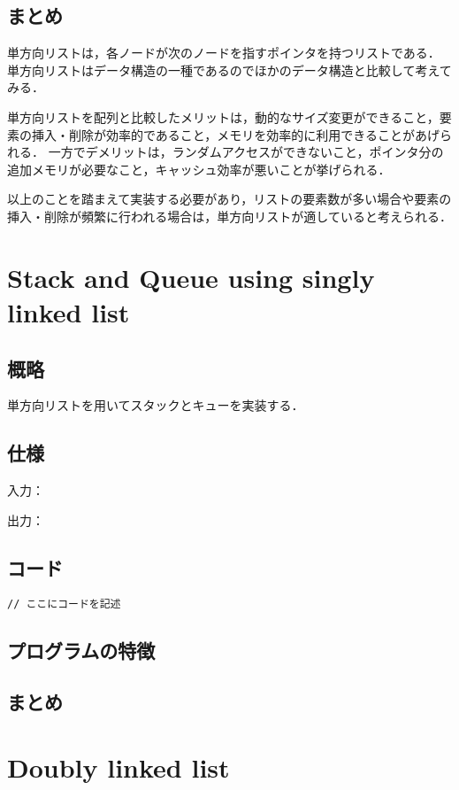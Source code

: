 \documentclass{ltjsarticle}
\begin{document}
\subsection{まとめ}
単方向リストは，各ノードが次のノードを指すポインタを持つリストである．
単方向リストはデータ構造の一種であるのでほかのデータ構造と比較して考えてみる．

単方向リストを配列と比較したメリットは，動的なサイズ変更ができること，要素の挿入・削除が効率的であること，メモリを効率的に利用できることがあげられる．
一方でデメリットは，ランダムアクセスができないこと，ポインタ分の追加メモリが必要なこと，キャッシュ効率が悪いことが挙げられる．

以上のことを踏まえて実装する必要があり，リストの要素数が多い場合や要素の挿入・削除が頻繁に行われる場合は，単方向リストが適していると考えられる．

\section{Stack and Queue using singly linked list}
\subsection{概略}
単方向リストを用いてスタックとキューを実装する．

\subsection{仕様}
\noindent 入力：

\noindent 出力：

\subsection{コード}
\begin{lstlisting}[frame=single, lineskip=-5pt]
// ここにコードを記述
\end{lstlisting}

\subsection{プログラムの特徴}

\subsection{まとめ}

\section{Doubly linked list}
\end{document}
